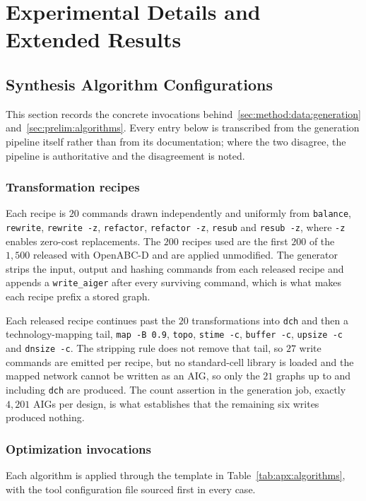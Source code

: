 
\chapter{Experimental Details and Extended Results}
\label{sec:apx:first_appendix}


\section{Synthesis Algorithm Configurations}
\label{sec:apx:algorithms}
This section records the concrete invocations
behind~\ref{sec:method:data:generation} and~\ref{sec:prelim:algorithms}. Every entry below is
transcribed from the generation pipeline itself rather than from its documentation; where
the two disagree, the pipeline is authoritative and the disagreement is noted.

\subsection*{Transformation recipes}
Each recipe is $20$ commands drawn independently and uniformly from
\texttt{balance}, \texttt{rewrite}, \texttt{rewrite -z}, \texttt{refactor},
\texttt{refactor -z}, \texttt{resub} and \texttt{resub -z}, where \texttt{-z} enables
zero-cost replacements. The $200$ recipes used are the first $200$ of the $1{,}500$
released with OpenABC-D \citep{chowdhury2021openabc} and are applied unmodified. The
generator strips the input, output and hashing commands from each released recipe and
appends a \texttt{write\_aiger} after every surviving command, which is what makes each
recipe prefix a stored graph.

Each released recipe continues past the $20$ transformations into \texttt{dch} and then a
technology-mapping tail, \texttt{map -B 0.9}, \texttt{topo}, \texttt{stime -c},
\texttt{buffer -c}, \texttt{upsize -c} and \texttt{dnsize -c}. The stripping rule does not
remove that tail, so $27$ write commands are emitted per recipe, but no standard-cell
library is loaded and the mapped network cannot be written as an AIG, so only the $21$
graphs up to and including \texttt{dch} are produced. The count assertion in the generation
job, exactly $4{,}201$ AIGs per design, is what establishes that the remaining six writes
produced nothing.

\subsection*{Optimization invocations}
Each algorithm is applied through the template in Table~\ref{tab:apx:algorithms}, with the
tool configuration file sourced first in every case.

